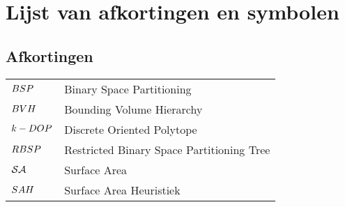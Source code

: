 \documentclass[master=cws,masteroption=mmc]{kulemt}
\begin{document}
\listoffigures
\listoftables
\listofalgorithms
{}
\chapter{Lijst van afkortingen en symbolen}
\section*{Afkortingen}
\begin{flushleft}
  \renewcommand{\arraystretch}{1.1}
  \begin{tabularx}{\textwidth}{@{}p{20mm}X@{}}
    $BSP$ & Binary Space Partitioning \\
    $BVH$ & Bounding Volume Hierarchy \\
    $k-DOP$ & Discrete Oriented Polytope \\ %
    $RBSP$ & Restricted Binary Space Partitioning Tree \\
    $\mathcal{SA}$   & Surface Area \\
    $SAH$  & Surface Area Heuristiek \\
  \end{tabularx}
\end{flushleft}
\end{document}
